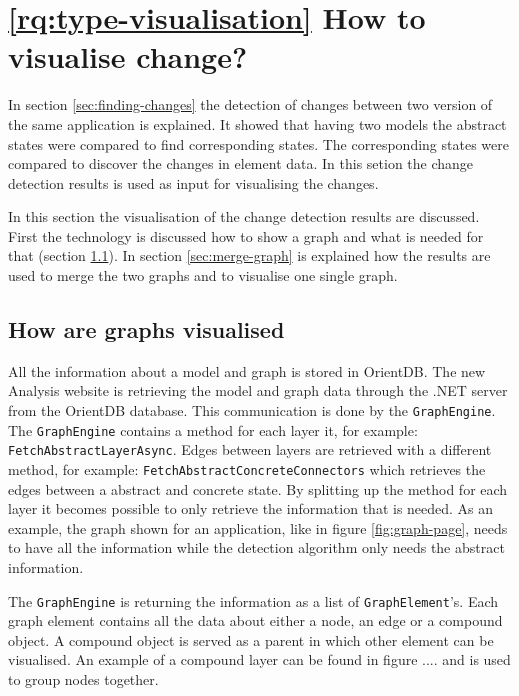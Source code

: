 \section{\ref{rq:type-visualisation} How to visualise change?} \label{rq:type-visualisation-answer}
In section \ref{sec:finding-changes} the detection of changes between two version of the same application is explained. It showed that having two models the abstract states were compared to find corresponding states. The corresponding states were compared to discover the changes in element data. In this setion the change detection results is used as input for visualising the changes. 

In this section the visualisation of the change detection results are discussed. First the technology is discussed how to show a graph and what is needed for that (section \ref{sec:graph-visualisation}). In section \ref{sec:merge-graph} is explained how the results are used to merge the two graphs and to visualise one single graph.

\subsection{How are graphs visualised} \label{sec:graph-visualisation}

All the information about a model and graph is stored in OrientDB. The new Analysis website is retrieving the model and graph data through the \testar .NET server from the OrientDB database. This communication is done by the \verb|GraphEngine|. The \verb|GraphEngine| contains a method for each layer it, for example: \verb|FetchAbstractLayerAsync|. Edges between layers are retrieved with a different method, for example: \verb|FetchAbstractConcreteConnectors| which retrieves the edges between a abstract and concrete state. By splitting up the method for each layer it becomes possible to only retrieve the information that is needed. As an example, the graph shown for an application, like in figure \ref{fig:graph-page}, needs to have all the information while the detection algorithm only needs the abstract information. 

The \verb|GraphEngine| is returning the information as a list of \verb|GraphElement|'s. Each graph element contains all the data about either a node, an edge or a compound object. A compound object is served as a parent in which other element can be visualised. An example of a compound layer can be found in figure ....  and is used to group nodes together.  

